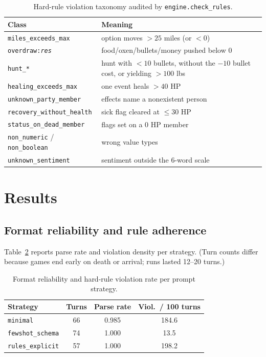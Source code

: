\documentclass{article}
\begin{document}
\begin{table}[t]
\caption{Hard-rule violation taxonomy audited by \texttt{engine.check\_rules}.}
\label{tab:taxonomy}
\centering
\scriptsize
\setlength{\tabcolsep}{3pt}
\begin{tabular}{lp{3.6cm}}
\toprule
Class & Meaning \\
\midrule
\texttt{miles\_exceeds\_max} & option moves $>25$ miles (or $<0$) \\
\texttt{overdraw:\emph{res}} & food/oxen/bullets/money pushed below 0 \\
\texttt{hunt\_*} & hunt with $<10$ bullets, without the $-10$ bullet cost, or yielding $>100$ lbs \\
\texttt{healing\_exceeds\_max} & one event heals $>40$ HP \\
\texttt{unknown\_party\_member} & effects name a nonexistent person \\
\texttt{recovery\_without\_health} & sick flag cleared at $\leq 30$ HP \\
\texttt{status\_on\_dead\_member} & flags set on a 0 HP member \\
\texttt{non\_numeric} / \texttt{non\_boolean} & wrong value types \\
\texttt{unknown\_sentiment} & sentiment outside the 6-word scale \\
\bottomrule
\end{tabular}
\end{table}

\section{Results}

\subsection{Format reliability and rule adherence}
Table~\ref{tab:format-rules} reports parse rate and violation density per strategy. (Turn
counts differ because games end early on death or arrival; runs lasted 12--20 turns.)
\begin{table}[t]
\caption{Format reliability and hard-rule violation rate per prompt strategy.}
\label{tab:format-rules}
\centering
\small
\begin{tabular}{lccc}
\toprule
Strategy & Turns & Parse rate & Viol.\ / 100 turns \\
\midrule
\texttt{minimal} & 66 & 0.985 & 184.6 \\
\texttt{fewshot\_schema} & 74 & 1.000 & 13.5 \\
\texttt{rules\_explicit} & 57 & 1.000 & 198.2 \\
\bottomrule
\end{tabular}
\end{table}
\end{document}
